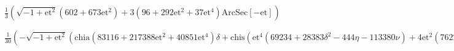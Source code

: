 \documentclass{article}
\begin{document}
\begin{doublespace}
\noindent\(\frac{1}{3} \left(\sqrt{-1+\text{et}^2} \left(602+673 \text{et}^2\right)+3 \left(96+292 \text{et}^2+37 \text{et}^4\right) \text{ArcSec}[-\text{et}]\right)\)
\end{doublespace}

\begin{doublespace}
\noindent\(\frac{1}{30} \left(-\sqrt{-1+\text{et}^2} \left(\text{chia} \left(83116+217388 \text{et}^2+40851 \text{et}^4\right) \delta +\text{chis}
\left(\text{et}^4 \left(69234+28383 \delta ^2-444 \eta -113380 \nu \right)+4 \text{et}^2 \left(76223+21876 \delta ^2-23693 \eta -92410 \nu \right)+4
\left(26536+5757 \delta ^2-10426 \eta -25720 \nu \right)\right)\right)-15 \left(\text{chia} \left(2384+13416 \text{et}^2+6762 \text{et}^4+195 \text{et}^6\right)
\delta +\text{chis} \left(3 \text{et}^4 \left(3472+1218 \delta ^2-580 \eta +\text{et}^2 \left(134+69 \delta ^2+44 \eta -268 \nu \right)-4976 \nu
\right)+8 \text{et}^2 \left(2274+597 \delta ^2-792 \eta -2564 \nu \right)+16 \left(188+39 \delta ^2-74 \eta -176 \nu \right)\right)\right) \text{ArcSec}[-\text{et}]\right)\)
\end{doublespace}
\end{document}
